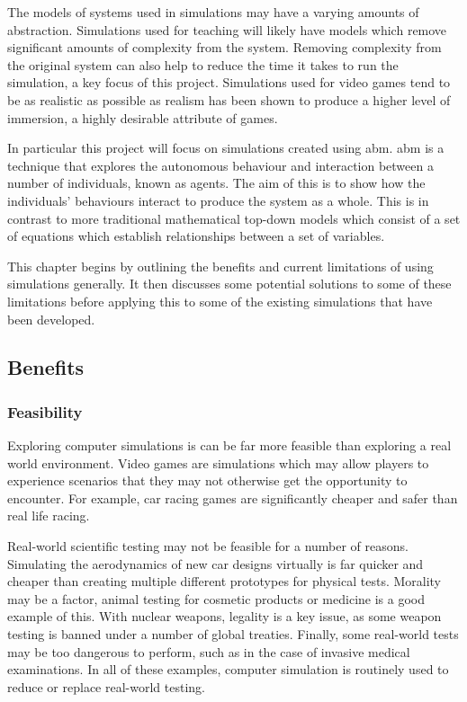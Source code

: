 \documentclass{UoYCSproject}
\begin{document}
The models of systems used in simulations may have a varying amounts of abstraction. Simulations used for teaching will likely have models which remove significant amounts of complexity from the system. Removing complexity from the original system can also help to reduce the time it takes to run the simulation, a key focus of this project. Simulations used for video games tend to be as realistic as possible as realism has been shown to produce a higher level of immersion\cite{realism_immersion}, a highly desirable attribute of games.


In particular this project will focus on simulations created using \gls{abm}.
\gls{abm} is a technique that explores the autonomous behaviour and interaction between a number of individuals, known as agents.
The aim of this is to show how the individuals' behaviours interact to produce the system as a whole.
This is in contrast to more traditional mathematical top-down models which consist of a set of equations which establish relationships between a set of variables.

This chapter begins by outlining the benefits and current limitations of using simulations generally.
It then discusses some potential solutions to some of these limitations before applying this to some of the existing simulations that have been developed.

\subsection{Benefits}
\subsubsection{Feasibility}
Exploring computer simulations is can be far more feasible than exploring a real world environment.
Video games are simulations which may allow players to experience scenarios that they may not otherwise get the opportunity to encounter.
For example, car racing games are significantly cheaper and safer than real life racing.

Real-world scientific testing may not be feasible for a number of reasons.
Simulating the aerodynamics of new car designs virtually is far quicker and cheaper than creating multiple different prototypes for physical tests.
Morality may be a factor, animal testing for cosmetic products or medicine is a good example of this. With nuclear weapons, legality is a key issue, as some weapon testing is banned under a number of global treaties\cite{partial_nuclear_test_ban_treaty, threshold_test_ban_treaty}.
Finally, some real-world tests may be too dangerous to perform, such as in the case of invasive medical examinations.
In all of these examples, computer simulation is routinely used to reduce or replace real-world testing.
\end{document}
